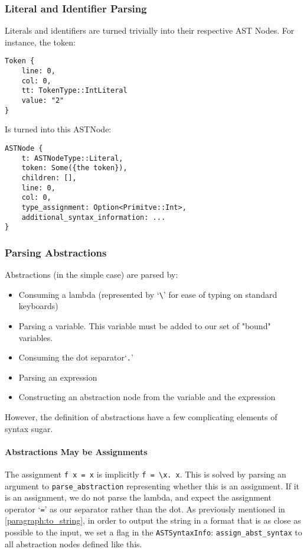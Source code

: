 \subsubsection{Literal and Identifier Parsing}
Literals and identifiers are turned trivially into their respective AST Nodes. For instance, the token:
\begin{verbatim}
Token {
    line: 0,
    col: 0,
    tt: TokenType::IntLiteral
    value: "2"
}
\end{verbatim}
Is turned into this ASTNode:
\begin{verbatim}
ASTNode {
    t: ASTNodeType::Literal,
    token: Some({the token}),
    children: [],
    line: 0,
    col: 0,
    type_assignment: Option<Primitve::Int>,
    additional_syntax_information: ...
}
\end{verbatim}

\subsubsection{Parsing Abstractions}
Abstractions (in the simple case) are parsed by:
\begin{itemize}
    \item Consuming a lambda (represented by `\verb|\|' for ease of typing on standard keyboards)
    \item Parsing a variable. This variable must be added to our set of "bound" variables.
    \item Consuming the dot separator`\verb|.|'
    \item Parsing an expression
    \item Constructing an abstraction node from the variable and the expression
\end{itemize}

However, the definition of abstractions have a few complicating elements of syntax sugar.

\paragraph{Abstractions May be Assignments}
The assignment \verb|f x = x| is implicitly \verb|f = \x. x|. This is solved by parsing an argument to \verb|parse_abstraction| representing whether this is an assignment. If it is an assignment, we do not parse the lambda, and expect the assignment operator `\verb|=|' as our separator rather than the dot. As previously mentioned in \ref{paragraph:to_string}, in order to output the string in a format that is as close as possible to the input, we set a flag in the \verb|ASTSyntaxInfo|: \verb|assign_abst_syntax| to all abstraction nodes defined like this. 

